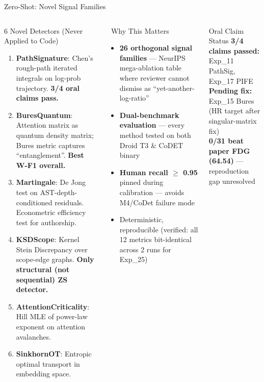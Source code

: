 \documentclass[aspectratio=169, 10pt]{beamer}
\begin{document}
\begin{frame}{Zero-Shot: Novel Signal Families}
\vspace{-0.15cm}
\begin{columns}[T]
\begin{block}{6 Novel Detectors (Never Applied to Code)}
\scriptsize
\begin{enumerate}\setlength\itemsep{3pt}
    \item[\faFlask] \textbf{PathSignature}: Chen's rough-path iterated integrals on log-prob trajectory. \textbf{3/4 oral claims pass.}
    \item[\faFlask] \textbf{BuresQuantum}: Attention matrix as quantum density matrix; Bures metric captures ``entanglement''. \textbf{Best W-F1 overall.}
    \item[\faFlask] \textbf{Martingale}: De Jong test on AST-depth-conditioned residuals. Econometric efficiency test for authorship.
    \item[\faFlask] \textbf{KSDScope}: Kernel Stein Discrepancy over scope-edge graphs. \textbf{Only structural (not sequential) ZS detector.}
    \item[\faFlask] \textbf{AttentionCriticality}: Hill MLE of power-law exponent on attention avalanches.
    \item[\faFlask] \textbf{SinkhornOT}: Entropic optimal transport in embedding space.
\end{enumerate}
\end{block}

\begin{exampleblock}{\faStar\ Why This Matters}
\small
\begin{itemize}\setlength\itemsep{4pt}
    \item[\ding{51}] \textbf{26 orthogonal signal families} --- NeurIPS mega-ablation table where reviewer cannot dismiss as ``yet-another-log-ratio''
    \item[\ding{51}] \textbf{Dual-benchmark evaluation} --- every method tested on both Droid T3 \& CoDET binary
    \item[\ding{51}] \textbf{Human recall $\geq$ 0.95} pinned during calibration --- avoids M4/CoDet failure mode
    \item[\ding{51}] Deterministic, reproducible (verified: all 12 metrics bit-identical across 2 runs for Exp\_25)
\end{itemize}
\end{exampleblock}

\begin{alertblock}{\scriptsize Oral Claim Status}
\scriptsize
\textbf{3/4 claims passed:} Exp\_11 PathSig, Exp\_17 PIFE\\
\textbf{Pending fix:} Exp\_15 Bures (HR target after singular-matrix fix)\\
\textbf{0/31 beat paper FDG (64.54)} --- reproduction gap unresolved
\end{alertblock}
\end{columns}
\end{frame}
\end{document}
